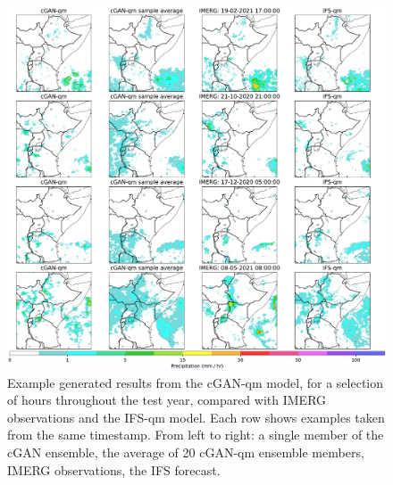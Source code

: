 \documentclass{article}
\begin{document}
\begin{figure}[ht!]
     \centering
     \includegraphics[width=1.05\textwidth]{images/cGAN_samples_IFS_final-nologs_217600.pdf}
     
     \caption{Example generated results from the cGAN-qm model, for a selection of hours throughout the test year, compared with IMERG observations and the IFS-qm model. Each row shows examples taken from the same timestamp. From left to right: a single member of the cGAN ensemble, the average of 20 cGAN-qm ensemble members, IMERG observations, the IFS forecast. }
     \label{fig:examples}
\end{figure}
\end{document}
